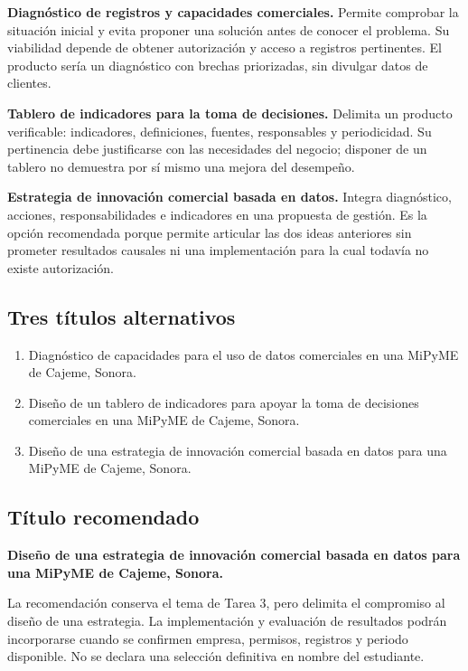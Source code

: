 \documentclass[
  spanish,
  11pt,
]{article}
\providecommand{\tightlist}{%
  \setlength{\itemsep}{0pt}\setlength{\parskip}{0pt}}
\begin{document}
\textbf{Diagnóstico de registros y capacidades comerciales.} Permite
comprobar la situación inicial y evita proponer una solución antes de
conocer el problema. Su viabilidad depende de obtener autorización y
acceso a registros pertinentes. El producto sería un diagnóstico con
brechas priorizadas, sin divulgar datos de clientes.

\textbf{Tablero de indicadores para la toma de decisiones.} Delimita un
producto verificable: indicadores, definiciones, fuentes, responsables y
periodicidad. Su pertinencia debe justificarse con las necesidades del
negocio; disponer de un tablero no demuestra por sí mismo una mejora del
desempeño.

\textbf{Estrategia de innovación comercial basada en datos.} Integra
diagnóstico, acciones, responsabilidades e indicadores en una propuesta
de gestión. Es la opción recomendada porque permite articular las dos
ideas anteriores sin prometer resultados causales ni una implementación
para la cual todavía no existe autorización.

\subsection{Tres títulos
alternativos}\label{tres-tuxedtulos-alternativos}

\begin{enumerate}
\def\labelenumi{\arabic{enumi}.}
\tightlist
\item
  Diagnóstico de capacidades para el uso de datos comerciales en una
  MiPyME de Cajeme, Sonora.
\item
  Diseño de un tablero de indicadores para apoyar la toma de decisiones
  comerciales en una MiPyME de Cajeme, Sonora.
\item
  Diseño de una estrategia de innovación comercial basada en datos para
  una MiPyME de Cajeme, Sonora.
\end{enumerate}

\subsection{Título recomendado}\label{tuxedtulo-recomendado}

\textbf{Diseño de una estrategia de innovación comercial basada en datos
para una MiPyME de Cajeme, Sonora.}

La recomendación conserva el tema de Tarea 3, pero delimita el
compromiso al diseño de una estrategia. La implementación y evaluación
de resultados podrán incorporarse cuando se confirmen empresa, permisos,
registros y periodo disponible. No se declara una selección definitiva
en nombre del estudiante.
\end{document}
